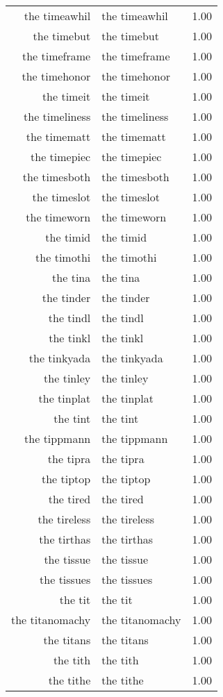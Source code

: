 \begin{table}[ht]
\begin{tabular}{rlr}
  the timeawhil & the timeawhil & 1.00 \\ 
  the timebut & the timebut & 1.00 \\ 
  the timeframe & the timeframe & 1.00 \\ 
  the timehonor & the timehonor & 1.00 \\ 
  the timeit & the timeit & 1.00 \\ 
  the timeliness & the timeliness & 1.00 \\ 
  the timematt & the timematt & 1.00 \\ 
  the timepiec & the timepiec & 1.00 \\ 
  the timesboth & the timesboth & 1.00 \\ 
  the timeslot & the timeslot & 1.00 \\ 
  the timeworn & the timeworn & 1.00 \\ 
  the timid & the timid & 1.00 \\ 
  the timothi & the timothi & 1.00 \\ 
  the tina & the tina & 1.00 \\ 
  the tinder & the tinder & 1.00 \\ 
  the tindl & the tindl & 1.00 \\ 
  the tinkl & the tinkl & 1.00 \\ 
  the tinkyada & the tinkyada & 1.00 \\ 
  the tinley & the tinley & 1.00 \\ 
  the tinplat & the tinplat & 1.00 \\ 
  the tint & the tint & 1.00 \\ 
  the tippmann & the tippmann & 1.00 \\ 
  the tipra & the tipra & 1.00 \\ 
  the tiptop & the tiptop & 1.00 \\ 
  the tired & the tired & 1.00 \\ 
  the tireless & the tireless & 1.00 \\ 
  the tirthas & the tirthas & 1.00 \\ 
  the tissue & the tissue & 1.00 \\ 
  the tissues & the tissues & 1.00 \\ 
  the tit & the tit & 1.00 \\ 
  the titanomachy & the titanomachy & 1.00 \\ 
  the titans & the titans & 1.00 \\ 
  the tith & the tith & 1.00 \\ 
  the tithe & the tithe & 1.00 \\ 

\end{tabular}
\end{table}
